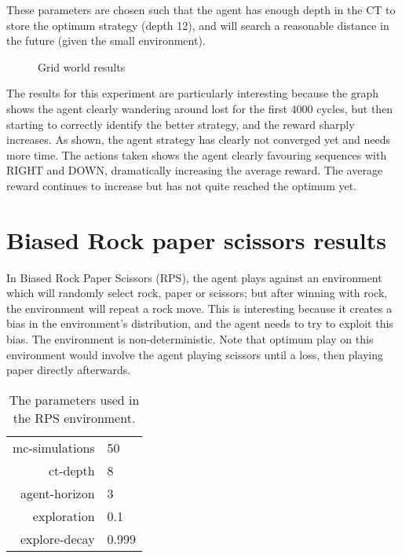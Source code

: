 \documentclass[pdftex,twoside,a4paper]{report}
\begin{document}
These parameters are chosen such that the agent has enough depth in the CT to store the optimum strategy (depth 12), and will search a reasonable distance in the future (given the small environment).

\begin{figure}[h]
  \begin{center}
  \end{center}
  \caption{Grid world results}
  \label{fig:grid_results}
\end{figure}
The results for this experiment are particularly interesting because the graph shows the agent clearly wandering around lost for the first 4000 cycles, but then starting to correctly identify the better strategy, and the reward sharply increases. As shown, the agent strategy has clearly not converged yet and needs more time. The actions taken shows the agent clearly favouring sequences with RIGHT and DOWN, dramatically increasing the average reward. The average reward continues to increase but has not quite reached the optimum yet.

\section{Biased Rock paper scissors results}
In Biased Rock Paper Scissors (RPS), the agent plays against an environment which will randomly select rock, paper or scissors; but after winning with rock, the environment will repeat a rock move. This is interesting because it creates a bias in the environment's distribution, and the agent needs to try to exploit this bias. The environment is non-deterministic. Note that optimum play on this environment would involve the agent playing scissors until a loss, then playing paper directly afterwards.

\begin{table}[h]
\begin{center}
\begin{tabular}{| r | l | }
\hline
mc-simulations & 50\\
ct-depth & 8\\
agent-horizon & 3\\
exploration & 0.1\\
explore-decay & 0.999\\
\hline
\end{tabular}
\caption{The parameters used in the RPS environment.}
\end{center}
\label{tab:rps_params}
\end{table}
\end{document}
